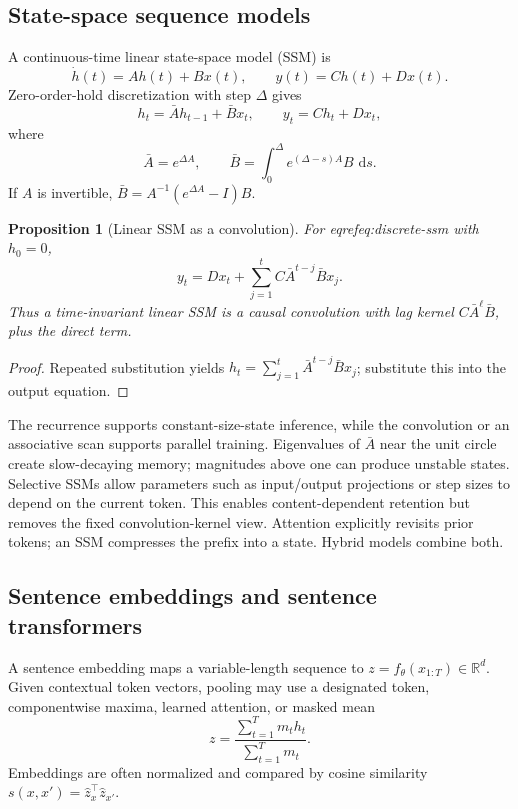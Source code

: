 \documentclass[12pt,oneside]{book}
\numberwithin{equation}{section}
\theoremstyle{definition}
\theoremstyle{plain}
\newtheorem{proposition}{Proposition}[section]
\theoremstyle{remark}
\newcommand{\R}{\mathbb{R}}
\newcommand{\dd}{\,\mathrm{d}}
\begin{document}
\subsection{State-space sequence models}

A continuous-time linear state-space model (SSM) is
\[
 \dot h(t)=Ah(t)+Bx(t),\qquad y(t)=Ch(t)+Dx(t).
\]
Zero-order-hold discretization with step $\Delta$ gives
\begin{equation}
 h_t=\bar Ah_{t-1}+\bar Bx_t,\qquad y_t=Ch_t+Dx_t,
 \label{eq:discrete-ssm}
\end{equation}
where
\[
 \bar A=e^{\Delta A},\qquad
 \bar B=\int_0^\Delta e^{(\Delta-s)A}B\,\dd s.
\]
If $A$ is invertible, $\bar B=A^{-1}(e^{\Delta A}-I)B$.

\begin{proposition}[Linear SSM as a convolution]
For eqref{eq:discrete-ssm} with $h_0=0$,
\[
 y_t=Dx_t+\sum_{j=1}^t C\bar A^{t-j}\bar Bx_j.
\]
Thus a time-invariant linear SSM is a causal convolution with lag kernel
$C\bar A^\ell\bar B$, plus the direct term.
\end{proposition}
\begin{proof}
Repeated substitution yields
$h_t=\sum_{j=1}^t\bar A^{t-j}\bar Bx_j$; substitute this into the output
equation.
\end{proof}

The recurrence supports constant-size-state inference, while the convolution
or an associative scan supports parallel training.  Eigenvalues of $\bar A$
near the unit circle create slow-decaying memory; magnitudes above one can
produce unstable states.  Selective SSMs allow parameters such as input/output
projections or step sizes to depend on the current token.  This enables
content-dependent retention but removes the fixed convolution-kernel view.
Attention explicitly revisits prior tokens; an SSM compresses the prefix into a
state.  Hybrid models combine both.

\subsection{Sentence embeddings and sentence transformers}

A sentence embedding maps a variable-length sequence to
$z=f_\theta(x_{1:T})\in\R^d$.  Given contextual token vectors, pooling may use
a designated token, componentwise maxima, learned attention, or masked mean
\[
 z=\frac{\sum_{t=1}^T m_th_t}{\sum_{t=1}^T m_t}.
\]
Embeddings are often normalized and compared by cosine similarity
$s(x,x')=\widehat z_x^\top\widehat z_{x'}$.
\end{document}
